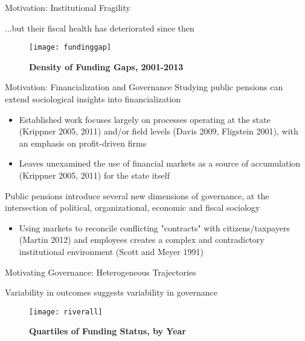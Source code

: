 \documentclass{beamer}
\begin{document}
\begin{frame}{\textmd{Motivation: Institutional Fragility}}
\begin{small}
...but their fiscal health has deteriorated since then
\end{small} 
\begin{figure}
\caption*{\textbf{Density of Funding Gaps, 2001-2013}} 	
    \texttt{[image: fundinggap]}
    \end{figure}
    \end{frame}

\begin{frame}{\textmd{Motivation: Financialization and Governance}}
Studying public pensions can extend sociological insights into financialization
\begin{scriptsize}
\begin{itemize}
\item Established work focuses largely on processes operating at the state (Krippner 2005, 2011) and/or field levels (Davis 2009, Fligstein 2001), with an emphasis on profit-driven firms
\item Leaves unexamined the use of financial markets as a source of accumulation (Krippner 2005, 2011) for the state itself
\end{itemize}
\end{scriptsize}
Public pensions introduce several new dimensions of governance, at the intersection of political, organizational, economic and fiscal sociology
\begin{scriptsize}
\begin{itemize}
\item Using markets to reconcile conflicting "contracts" with citizens/taxpayers (Martin 2012) and employees creates a complex and contradictory institutional environment (Scott and Meyer 1991)
\end{itemize}
\end{scriptsize}

\end{frame}


\begin{frame}{\textmd{Motivating Governance: Heterogeneous Trajectories}}
\begin{small}
Variability in outcomes suggests variability in governance
\end{small}
\begin{figure}
\caption*{\textbf{Quartiles of Funding Status, by Year}} 	
	\texttt{[image: riverall]}
	\end{figure}
\end{frame}
\end{document}
